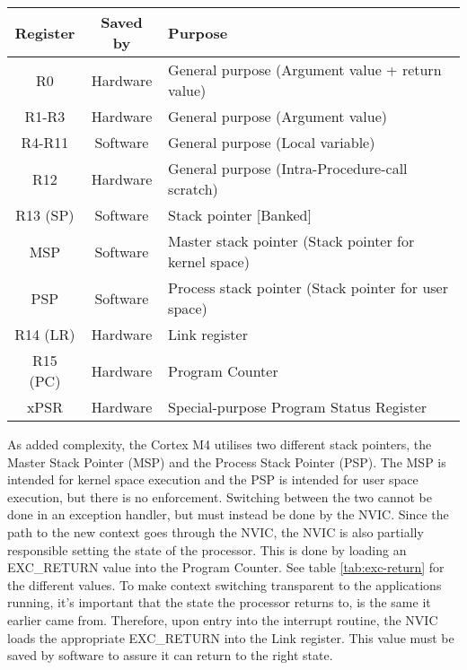 \begin{table}[H]
	\centering
	\begin{tabular}{|c|c|p{9.5cm}|}
		\hline
		Register	&	Saved by	&	Purpose\\
		\hline
		R0			&	Hardware	&	General purpose (Argument value + return value)\\
		\hline
		R1-R3		&	Hardware	&	General purpose (Argument value)\\
		\hline
		R4-R11		&	Software	&	General purpose (Local variable)\\
		\hline
		R12			&	Hardware	&	General purpose (Intra-Procedure-call scratch)\\
		\hline
		R13 (SP)	&	Software	&	Stack pointer [Banked]\\
		MSP			&	Software	&	Master stack pointer (Stack pointer for kernel space)\\
		PSP			&	Software	&	Process stack pointer (Stack pointer for user space)\\
		\hline
		R14 (LR)	&	Hardware	&	Link register\\
		\hline
		R15 (PC)	&	Hardware	&	Program Counter\\
		\hline
		xPSR		&	Hardware	& 	Special-purpose Program Status Register\\
		\hline
	\end{tabular}
	\label{tab:registers}
\end{table}
As added complexity, the Cortex M4 utilises two different stack pointers, the Master Stack Pointer (MSP) and the Process Stack Pointer (PSP).
The MSP is intended for kernel space execution and the PSP is intended for user space execution, but there is no enforcement.
Switching between the two cannot be done in an exception handler, but must instead be done by the NVIC.
Since the path to the new context goes through the NVIC, the NVIC is also partially responsible setting the state of the processor.
This is done by loading an EXC\_RETURN value into the Program Counter. See table \ref{tab:exc-return} for the different values.
To make context switching transparent to the applications running, it's important that the state the processor returns to, is the
same it earlier came from. Therefore, upon entry into the interrupt routine, the NVIC loads the appropriate EXC\_RETURN into the Link
register. This value must be saved by software to assure it can return to the right state.


